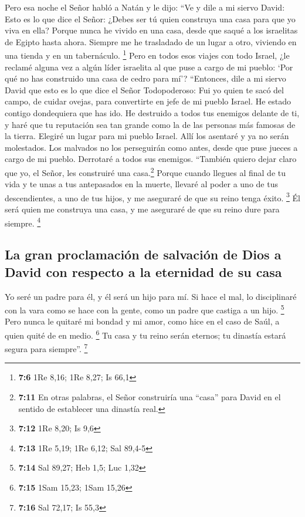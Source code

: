  Pero esa noche el Señor habló a Natán y le dijo:
 ``Ve y dile a mi siervo David: Esto es lo que dice el
Señor: ¿Debes ser tú quien construya una casa para que yo viva en ella?
 Porque nunca he vivido en una casa, desde que saqué a los
israelitas de Egipto hasta ahora. Siempre me he trasladado de un lugar a
otro, viviendo en una tienda y en un tabernáculo. \footnote{\textbf{7:6}
  1Re 8,16; 1Re 8,27; Is 66,1}  Pero en todos esos viajes
con todo Israel, ¿le reclamé alguna vez a algún líder israelita al que
puse a cargo de mi pueblo: `Por qué no has construido una casa de cedro
para mí'?  ``Entonces, dile a mi siervo David que esto es
lo que dice el Señor Todopoderoso: Fui yo quien te sacó del campo, de
cuidar ovejas, para convertirte en jefe de mi pueblo Israel.
 He estado contigo dondequiera que has ido. He destruido a
todos tus enemigos delante de ti, y haré que tu reputación sea tan
grande como la de las personas más famosas de la tierra. 
Elegiré un lugar para mi pueblo Israel. Allí los asentaré y ya no serán
molestados. Los malvados no los perseguirán como antes, 
desde que puse jueces a cargo de mi pueblo. Derrotaré a todos sus
enemigos. ``También quiero dejar claro que yo, el Señor, les construiré
una casa.\footnote{\textbf{7:11} En otras palabras, el Señor construiría
  una ``casa'' para David en el sentido de establecer una dinastía real.}
 Porque cuando llegues al final de tu vida y te unas a
tus antepasados en la muerte, llevaré al poder a uno de tus
descendientes, a uno de tus hijos, y me aseguraré de que su reino tenga
éxito. \footnote{\textbf{7:12} 1Re 8,20; Is 9,6}  Él será
quien me construya una casa, y me aseguraré de que su reino dure para
siempre. \footnote{\textbf{7:13} 1Re 5,19; 1Re 6,12; Sal 89,4-5}

\hypertarget{la-gran-proclamaciuxf3n-de-salvaciuxf3n-de-dios-a-david-con-respecto-a-la-eternidad-de-su-casa}{%
\subsection{La gran proclamación de salvación de Dios a David con
respecto a la eternidad de su
casa}\label{la-gran-proclamaciuxf3n-de-salvaciuxf3n-de-dios-a-david-con-respecto-a-la-eternidad-de-su-casa}}

 Yo seré un padre para él, y él será un hijo para mí. Si
hace el mal, lo disciplinaré con la vara como se hace con la gente, como
un padre que castiga a un hijo. \footnote{\textbf{7:14} Sal 89,27; Heb
  1,5; Luc 1,32}  Pero nunca le quitaré mi bondad y mi
amor, como hice en el caso de Saúl, a quien quité de en medio.
\footnote{\textbf{7:15} 1Sam 15,23; 1Sam 15,26}  Tu casa
y tu reino serán eternos; tu dinastía estará segura para siempre''.
\footnote{\textbf{7:16} Sal 72,17; Is 55,3}

